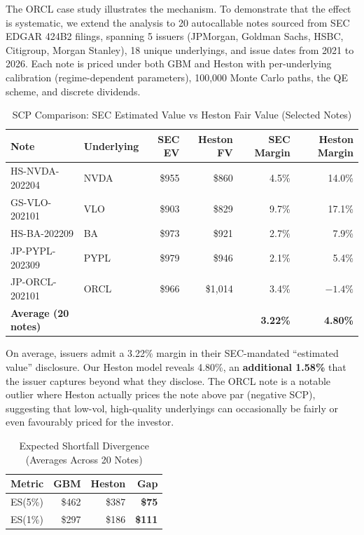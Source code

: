 \documentclass[12pt,a4paper]{article}
\begin{document}
The ORCL case study illustrates the mechanism. To demonstrate that the effect is systematic, we extend the analysis to 20 autocallable notes sourced from SEC EDGAR 424B2 filings, spanning 5 issuers (JPMorgan, Goldman Sachs, HSBC, Citigroup, Morgan Stanley), 18 unique underlyings, and issue dates from 2021 to 2026. Each note is priced under both GBM and Heston with per-underlying calibration (regime-dependent parameters), 100,000 Monte Carlo paths, the QE scheme, and discrete dividends.

\begin{table}[H]
\centering
\caption{SCP Comparison: SEC Estimated Value vs Heston Fair Value (Selected Notes)}
\label{tab:scp_20}
\begin{tabular}{@{}llrrrr@{}}
\toprule
\textbf{Note} & \textbf{Underlying} & \textbf{SEC EV} & \textbf{Heston FV} & \textbf{SEC Margin} & \textbf{Heston Margin} \\
\midrule
HS-NVDA-202204 & NVDA & \$955 & \$860 & 4.5\% & 14.0\% \\
GS-VLO-202101 & VLO & \$903 & \$829 & 9.7\% & 17.1\% \\
HS-BA-202209 & BA & \$973 & \$921 & 2.7\% & 7.9\% \\
JP-PYPL-202309 & PYPL & \$979 & \$946 & 2.1\% & 5.4\% \\
JP-ORCL-202101 & ORCL & \$966 & \$1,014 & 3.4\% & $-1.4\%$ \\
\midrule
\textbf{Average (20 notes)} & & & & \textbf{3.22\%} & \textbf{4.80\%} \\
\bottomrule
\end{tabular}
\end{table}

On average, issuers admit a 3.22\% margin in their SEC-mandated ``estimated value'' disclosure. Our Heston model reveals 4.80\%, an \textbf{additional 1.58\%} that the issuer captures beyond what they disclose. The ORCL note is a notable outlier where Heston actually prices the note above par (negative SCP), suggesting that low-vol, high-quality underlyings can occasionally be fairly or even favourably priced for the investor.

\begin{table}[H]
\centering
\caption{Expected Shortfall Divergence (Averages Across 20 Notes)}
\label{tab:es_20}
\begin{tabular}{@{}lrrr@{}}
\toprule
\textbf{Metric} & \textbf{GBM} & \textbf{Heston} & \textbf{Gap} \\
\midrule
ES(5\%) & \$462 & \$387 & \textbf{\$75} \\
ES(1\%) & \$297 & \$186 & \textbf{\$111} \\
\bottomrule
\end{tabular}
\end{table}
\end{document}
